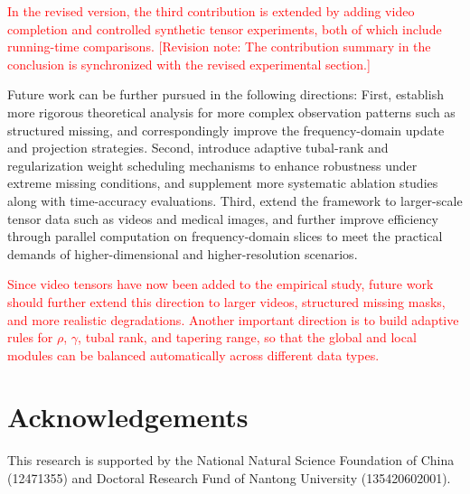 \documentclass[a4paper,12pt]{article}
\numberwithin{equation}{section}
\numberwithin{algorithm}{section}
\newcommand{\rev}[1]{\textcolor{red}{#1}}
\newcommand{\revnote}[1]{\textcolor{red}{[Revision note: #1]}}
\theoremstyle{remark}
\theoremstyle{definition}
\begin{document}
\rev{In the revised version, the third contribution is extended by adding video completion and controlled synthetic tensor experiments, both of which include running-time comparisons.} \revnote{The contribution summary in the conclusion is synchronized with the revised experimental section.}

Future work can be further pursued in the following directions: First, establish more rigorous theoretical analysis for more complex observation patterns such as structured missing, and correspondingly improve the frequency-domain update and projection strategies. Second, introduce adaptive tubal-rank and regularization weight scheduling mechanisms to enhance robustness under extreme missing conditions, and supplement more systematic ablation studies along with time-accuracy evaluations. Third, extend the framework to larger-scale tensor data such as videos and medical images, and further improve efficiency through parallel computation on frequency-domain slices to meet the practical demands of higher-dimensional and higher-resolution scenarios.

\rev{Since video tensors have now been added to the empirical study, future work should further extend this direction to larger videos, structured missing masks, and more realistic degradations. Another important direction is to build adaptive rules for $\rho$, $\gamma$, tubal rank, and tapering range, so that the global and local modules can be balanced automatically across different data types.}









\section*{Acknowledgements}

This research is supported by the National Natural Science Foundation of China (12471355) and Doctoral Research Fund of Nantong University  (135420602001).
\end{document}
